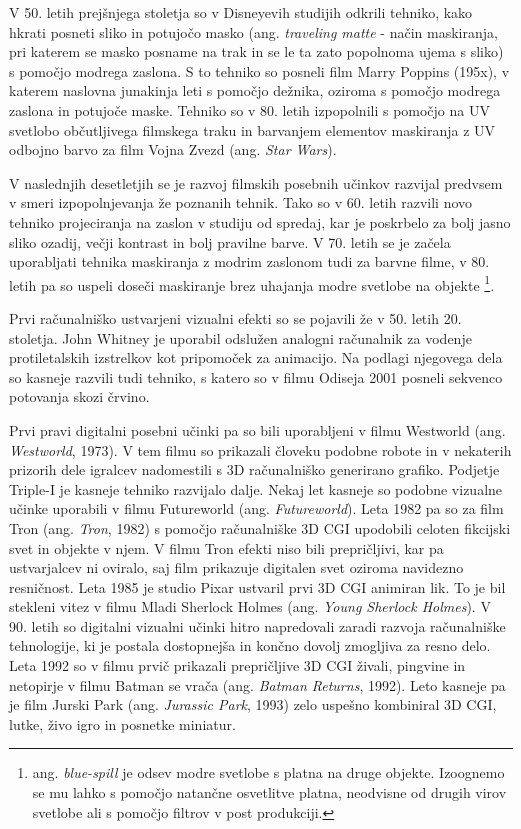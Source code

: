 \documentclass[a4paper, 12pt]{book}
\begin{document}
V 50. letih prejšnjega stoletja so v Disneyevih studijih odkrili tehniko, kako hkrati posneti sliko in potujočo masko (ang. {\it traveling matte} - način maskiranja, pri katerem se masko posname na trak in se le ta zato popolnoma ujema s sliko) s pomočjo modrega zaslona. 
S to tehniko so posneli film Marry Poppins (195x), v katerem naslovna junakinja leti s pomočjo dežnika, oziroma s pomočjo modrega zaslona in potujoče maske. %
Tehniko so v 80. letih izpopolnili s pomočjo na UV svetlobo občutljivega filmskega traku in barvanjem elementov maskiranja z UV odbojno barvo za film Vojna Zvezd (ang. {\it Star Wars}). 

V naslednjih desetletjih se je razvoj filmskih posebnih učinkov razvijal predvsem v smeri izpopolnjevanja že poznanih tehnik. 
Tako so v 60. letih razvili novo tehniko projeciranja na zaslon v studiju od spredaj, kar je poskrbelo za bolj jasno sliko ozadij, večji kontrast in bolj pravilne barve. 
V 70. letih se je začela uporabljati tehnika maskiranja z modrim zaslonom tudi za barvne filme, v 80. letih pa so uspeli doseči maskiranje brez uhajanja modre svetlobe na objekte
\footnote{ang. {\it blue-spill} je odsev modre svetlobe s platna na druge objekte. 
Izoognemo se mu lahko s pomočjo natančne osvetlitve platna, neodvisne od drugih virov svetlobe ali s pomočjo filtrov v post produkciji.}.

Prvi računalniško ustvarjeni vizualni efekti so se pojavili že v 50. letih 20. stoletja. 
John Whitney je uporabil odslužen analogni računalnik za vodenje protiletalskih izstrelkov kot pripomoček za animacijo. 
Na podlagi njegovega dela so kasneje razvili tudi tehniko, s katero so v filmu Odiseja 2001 posneli sekvenco potovanja skozi črvino.

Prvi pravi digitalni posebni učinki pa so bili uporabljeni v filmu Westworld (ang. {\it Westworld}, 1973). %
V tem filmu so prikazali človeku podobne robote in v nekaterih prizorih dele igralcev nadomestili s 3D računalniško generirano grafiko. 
Podjetje Triple-I je kasneje tehniko razvijalo dalje.
Nekaj let kasneje so podobne vizualne učinke uporabili v filmu Futureworld (ang. {\it Futureworld}).
Leta 1982 pa so za film Tron (ang. {\it Tron}, 1982) s pomočjo računalniške 3D CGI upodobili celoten fikcijski svet in objekte v njem.
V filmu Tron efekti niso bili prepričljivi, kar pa ustvarjalcev ni oviralo, saj film prikazuje digitalen svet oziroma navidezno resničnost.
Leta 1985 je studio Pixar ustvaril prvi 3D CGI animiran lik.
To je bil stekleni vitez v filmu Mladi Sherlock Holmes (ang. {\it Young Sherlock Holmes}).
V 90. letih so digitalni vizualni učinki hitro napredovali zaradi razvoja računalniške tehnologije, ki je postala dostopnejša in končno dovolj zmogljiva za resno delo.
Leta 1992 so v filmu prvič prikazali prepričljive 3D CGI živali, pingvine in netopirje v filmu Batman se vrača (ang. {\it Batman Returns}, 1992). %
Leto kasneje pa je film Jurski Park (ang. {\it Jurassic Park}, 1993) zelo uspešno kombiniral 3D CGI, lutke, živo igro in posnetke miniatur. 
\end{document}

